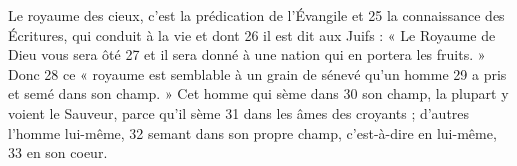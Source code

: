 Le royaume des cieux, c'est la prédication de l'Évangile et	 
25	 	la connaissance des Écritures, qui conduit à la vie et dont	 
26	 	il est dit aux Juifs : « Le Royaume de Dieu vous sera ôté	 
27	 	et il sera donné à une nation qui en portera les fruits. » Donc	 
28	 	ce « royaume est semblable à un grain de sénevé qu'un homme	 
29	 	a pris et semé dans son champ. »
Cet homme qui sème dans	 
30	 	son champ, la plupart y voient le Sauveur, parce qu'il sème	 
31	 	dans les âmes des croyants ; d'autres l'homme lui-même,	 
32	 	semant dans son propre champ, c'est-à-dire en lui-même,	 
33	 	en son coeur.